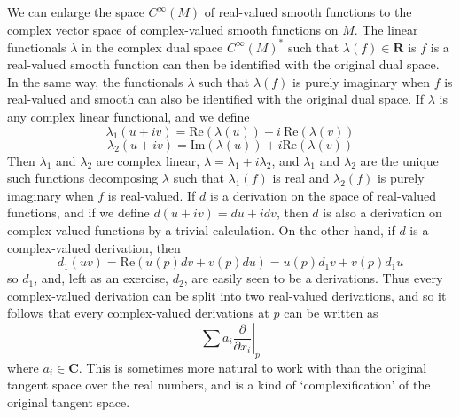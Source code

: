 \begin{remark}
    We can enlarge the space $C^\infty(M)$ of real-valued smooth functions to the complex vector space of complex-valued smooth functions on $M$. The linear functionals $\lambda$ in the complex dual space $C^\infty(M)^*$ such that $\lambda(f) \in \mathbf{R}$ is $f$ is a real-valued smooth function can then be identified with the original dual space. In the same way, the functionals $\lambda$ such that $\lambda(f)$ is purely imaginary when $f$ is real-valued and smooth can also be identified with the original dual space. If $\lambda$ is any complex linear functional, and we define
    \[ \lambda_1(u + iv) = \text{Re}(\lambda(u)) + i\ \text{Re}(\lambda(v)) \]
    \[ \lambda_2(u + iv) = \text{Im}(\lambda(u)) + i\text{Re}(\lambda(v)) \]
    Then $\lambda_1$ and $\lambda_2$ are complex linear, $\lambda = \lambda_1 + i\lambda_2$, and $\lambda_1$ and $\lambda_2$ are the unique such functions decomposing $\lambda$ such that $\lambda_1(f)$ is real and $\lambda_2(f)$ is purely imaginary when $f$ is real-valued. If $d$ is a derivation on the space of real-valued functions, and if we define $d(u + iv) = du + idv$, then $d$ is also a derivation on complex-valued functions by a trivial calculation. On the other hand, if $d$ is a complex-valued derivation, then
    \[ d_1(uv) = \text{Re}(u(p) dv + v(p) du) = u(p) d_1v + v(p) d_1u \]
    so $d_1$, and, left as an exercise, $d_2$, are easily seen to be a derivations. Thus every complex-valued derivation can be split into two real-valued derivations, and so it follows that every complex-valued derivations at $p$ can be written as
    \[ \sum a_i \left. \frac{\partial}{\partial x_i} \right|_p \]
    where $a_i \in \mathbf{C}$. This is sometimes more natural to work with than the original tangent space over the real numbers, and is a kind of `complexification' of the original tangent space.
\end{remark}


